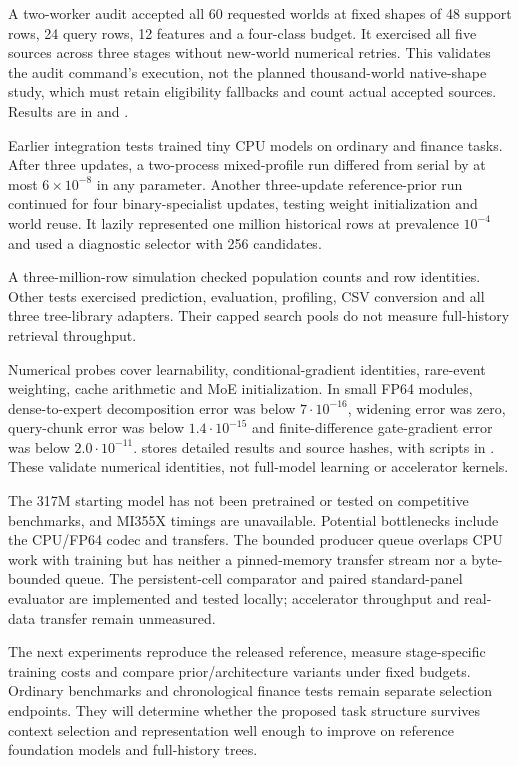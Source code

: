 \documentclass[11pt]{article}
\begin{document}
A two-worker audit accepted all 60 requested worlds at fixed shapes of 48 support rows, 24 query rows, 12 features and a four-class budget. It exercised all five sources across three stages without new-world numerical retries. This validates the audit command's execution, not the planned thousand-world native-shape study, which must retain eligibility fallbacks and count actual accepted sources. Results are in  and .

Earlier integration tests trained tiny CPU models on ordinary and finance tasks. After three updates, a two-process mixed-profile run differed from serial by at most $6\times10^{-8}$ in any parameter. Another three-update reference-prior run continued for four binary-specialist updates, testing weight initialization and world reuse. It lazily represented one million historical rows at prevalence $10^{-4}$ and used a diagnostic selector with 256 candidates.

A three-million-row simulation checked population counts and row identities. Other tests exercised prediction, evaluation, profiling, CSV conversion and all three tree-library adapters. Their capped search pools do not measure full-history retrieval throughput.

Numerical probes cover learnability, conditional-gradient identities, rare-event weighting, cache arithmetic and MoE initialization. In small FP64 modules, dense-to-expert decomposition error was below $7\cdot10^{-16}$, widening error was zero, query-chunk error was below $1.4\cdot10^{-15}$ and finite-difference gate-gradient error was below $2.0\cdot10^{-11}$.  stores detailed results and source hashes, with scripts in . These validate numerical identities, not full-model learning or accelerator kernels.

The 317M starting model has not been pretrained or tested on competitive benchmarks, and MI355X timings are unavailable. Potential bottlenecks include the CPU/FP64 codec and transfers. The bounded producer queue overlaps CPU work with training but has neither a pinned-memory transfer stream nor a byte-bounded queue. The persistent-cell comparator and paired standard-panel evaluator are implemented and tested locally; accelerator throughput and real-data transfer remain unmeasured.

The next experiments reproduce the released reference, measure stage-specific training costs and compare prior/architecture variants under fixed budgets. Ordinary benchmarks and chronological finance tests remain separate selection endpoints. They will determine whether the proposed task structure survives context selection and representation well enough to improve on reference foundation models and full-history trees.
\end{document}
